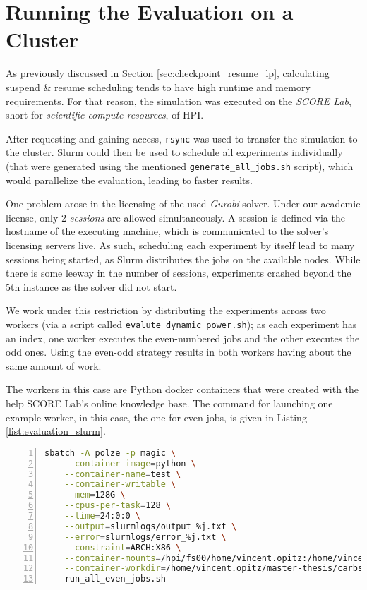 
\section{Running the Evaluation on a Cluster}

As previously discussed in Section \ref{sec:checkpoint_resume_lp}, calculating suspend \& resume scheduling tends to have high runtime and memory requirements. 
For that reason, the simulation was executed on the \emph{SCORE Lab}, short for \emph{scientific compute resources}, of HPI.

After requesting and gaining access, \verb|rsync| was used to transfer the simulation to the cluster. 
Slurm could then be used to schedule all experiments individually (that were generated using the mentioned \verb|generate_all_jobs.sh| script), which would parallelize the evaluation, leading to faster results.

One problem arose in the licensing of the used \emph{Gurobi} solver. 
Under our academic license, only 2 \emph{sessions} are allowed simultaneously.
A session is defined via the hostname of the executing machine, which is communicated to the solver's licensing servers live.
As such, scheduling each experiment by itself lead to many sessions being started, as Slurm distributes the jobs on the available nodes.
While there is some leeway in the number of sessions, experiments crashed beyond the 5th instance as the solver did not start.

We work under this restriction by distributing the experiments across two workers (via a script called \verb|evalute_dynamic_power.sh|); as each experiment has an index, one worker executes the even-numbered jobs and the other executes the odd ones. 
Using the even-odd strategy results in both workers having about the same amount of work.

The workers in this case are Python docker containers that were created with the help SCORE Lab's online knowledge base.
The command for launching one example worker, in this case, the one for even jobs, is given in Listing \ref{list:evaluation_slurm}.

\begin{minipage}{\linewidth}
\begin{lstlisting}[language=bash, frame=single, numbers=left, caption={Executing the Evaluation inside the SCORE Lab's Slurm environment}, label={list:evaluation_slurm}, basicstyle=\ttfamily]
sbatch -A polze -p magic \
    --container-image=python \
    --container-name=test \
    --container-writable \
    --mem=128G \
    --cpus-per-task=128 \
    --time=24:0:0 \
    --output=slurmlogs/output_%j.txt \
    --error=slurmlogs/error_%j.txt \
    --constraint=ARCH:X86 \
    --container-mounts=/hpi/fs00/home/vincent.opitz:/home/vincent.opitz \
    --container-workdir=/home/vincent.opitz/master-thesis/carbs \
    run_all_even_jobs.sh
        \end{lstlisting}    
\end{minipage}

